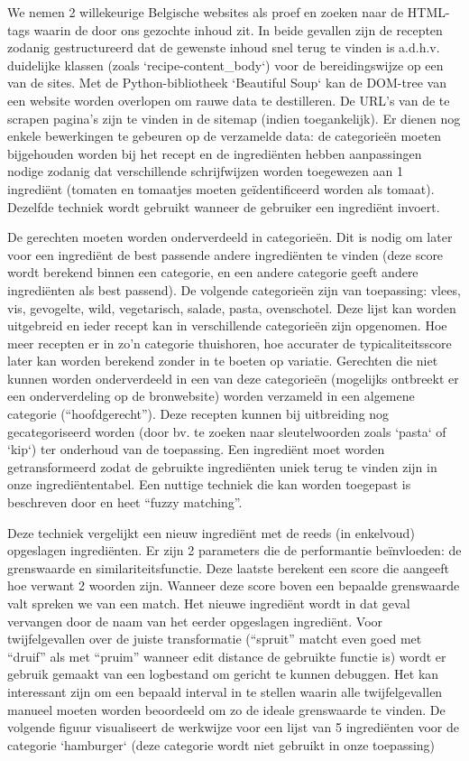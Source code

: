 \documentclass{hogent-article}
\begin{document}
We nemen 2 willekeurige Belgische websites als proef en zoeken naar de HTML-tags waarin de door ons gezochte inhoud zit. In beide gevallen zijn de recepten zodanig gestructureerd dat de gewenste inhoud snel terug te vinden is a.d.h.v. duidelijke klassen (zoals `recipe-content\_body`) voor de bereidingswijze op een van de sites. Met de Python-bibliotheek `Beautiful Soup` kan de DOM-tree van een website worden overlopen om rauwe data te destilleren. De URL's van de te scrapen pagina's zijn te vinden in de sitemap (indien toegankelijk).  Er dienen nog enkele bewerkingen te gebeuren op de verzamelde data: de categorieën moeten bijgehouden worden bij het recept en de ingrediënten hebben aanpassingen nodige zodanig dat verschillende schrijfwijzen worden toegewezen aan 1 ingrediënt (tomaten en tomaatjes moeten geïdentificeerd worden als tomaat). Dezelfde techniek wordt gebruikt wanneer de gebruiker een ingrediënt invoert.

De gerechten moeten worden onderverdeeld in categorieën. Dit is nodig om later voor een ingrediënt de best passende andere ingrediënten te vinden (deze score wordt berekend binnen een categorie, en een andere categorie geeft andere ingrediënten als best passend). De volgende categorieën zijn van toepassing: vlees, vis, gevogelte, wild, vegetarisch, salade, pasta, ovenschotel. Deze lijst kan worden uitgebreid en ieder recept kan in verschillende categorieën zijn opgenomen. Hoe meer recepten er in zo'n categorie thuishoren, hoe accurater de typicaliteitsscore \autocite{Yokoi2015} later kan worden berekend zonder in te boeten op variatie. Gerechten die niet kunnen worden onderverdeeld in een van deze categorieën (mogelijks ontbreekt er een onderverdeling op de bronwebsite) worden verzameld in een algemene categorie (“hoofdgerecht”). Deze recepten kunnen bij uitbreiding nog gecategoriseerd worden (door bv. te zoeken naar sleutelwoorden zoals `pasta` of `kip`) ter onderhoud van de toepassing.
Een ingrediënt moet worden getransformeerd zodat de gebruikte ingrediënten uniek terug te vinden zijn in onze ingrediëntentabel. Een nuttige techniek die kan worden toegepast is beschreven door \textcite{Chaudhuri2003} en heet “fuzzy matching”.  

Deze techniek vergelijkt een nieuw ingrediënt met de reeds (in enkelvoud) opgeslagen ingrediënten. Er zijn 2 parameters die de performantie beïnvloeden: de grenswaarde en similariteitsfunctie. Deze laatste berekent een score die aangeeft hoe verwant 2 woorden zijn. Wanneer deze score boven een bepaalde grenswaarde valt spreken we van een match. Het nieuwe ingrediënt wordt in dat geval vervangen door de naam van het eerder opgeslagen ingrediënt. Voor twijfelgevallen over de juiste transformatie (“spruit” matcht even goed met “druif” als met “pruim” wanneer edit distance \autocite{Chaudhuri2003} de gebruikte functie is) wordt er gebruik gemaakt van een logbestand om gericht te kunnen debuggen. Het kan interessant zijn om een bepaald interval in te stellen waarin alle twijfelgevallen manueel moeten worden beoordeeld om zo de ideale grenswaarde te vinden. De volgende figuur visualiseert de werkwijze voor een lijst van 5 ingrediënten voor de categorie `hamburger` (deze categorie wordt niet gebruikt in onze toepassing)
\end{document}
